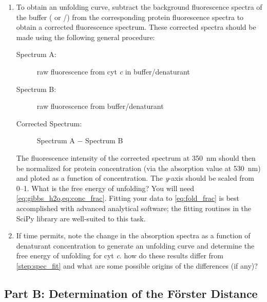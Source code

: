 \documentclass[nobib,nofonts,nols,nohyper]{tufte-handout}
\begin{document}
\begin{enumerate}
  Use ``high'' sensitivity and \SI{5}{\nm} slits for both excitation and emission. 
  These spectra will be used to determine the free energy of unfolding of cyt \emph{c} using fluorescence shanges of Trp-59 as the probe. 
  You will see a large peak at \SI{\sim323}{\nm} in the spectra of the buffers ( and /) as well as in some of your cyt \emph{c} samples. 
  Discuss the origin of this peak with your lab instructor. 
  \label{step:fluor_spec}
  \item To obtain an unfolding curve, subtract the background fluorescence spectra of the buffer ( or /) from the corresponding protein fluorescence spectra to obtain a corrected fluorescence spectrum. 
  These corrected spectra should be made using the following general procedure:
  \begin{description}
    \item [Spectrum A:] raw fluorescence from cyt \emph{c} in buffer/denaturant
    \item [Spectrum B:] raw fluorescence from buffer/denaturant
    \item [Corrected Spectrum:] Spectrum A \( - \) Spectrum B
  \end{description}
  The fluorescence intensity of the corrected spectrum at \SI{350}{\nm} should then be normalized for protein concentration (via the absorption value at \SI{530}{\nm}) and ploted as a function of  concentration. 
  The \emph{y}-axis should be scaled from \numrange{0}{1}. 
  What is the free energy of unfolding?
  You will need \cref{eq:gibbs_h2o,eq:conc_frac}. 
  Fitting your data to \cref{eq:fold_frac} is best accomplished with advanced analytical software; the fitting routines in the SciPy library are well-suited to this task. 
  \label{step:spec_fit}
  \item If time permits, note the change in the absorption spectra as a function of denaturant concentration to generate an unfolding curve and determine the free energy of unfolding for cyt \emph{c}. 
  how do these results differ from \cref{step:spec_fit} and what are some possible origins of the differences (if any)?
\end{enumerate}


\subsection{Part B: Determination of the Förster Distance} %
\label{sub:part_b_determination_of_the_forster_distance}
\end{document}
